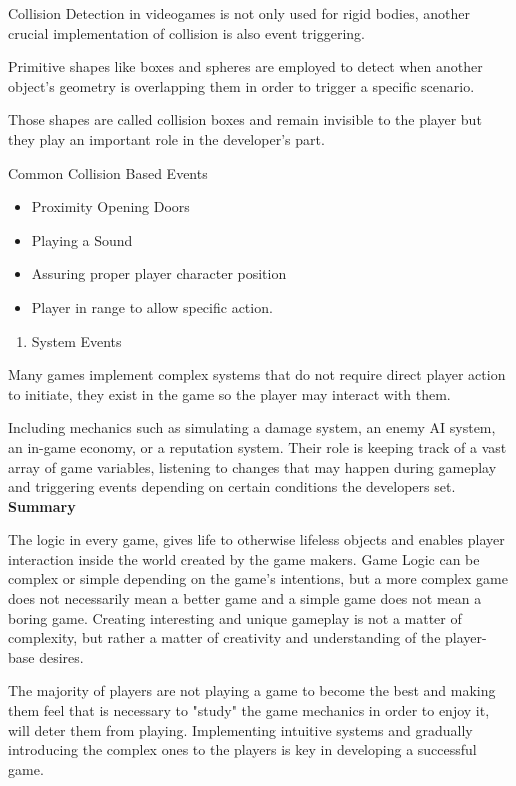 \documentclass[a4paper,one side,12pt]{book}
\begin{document}
Collision Detection in videogames is not only used for rigid bodies,
another crucial implementation of collision is also event triggering.

Primitive shapes like boxes and spheres are employed to detect when
another object's geometry is overlapping them in order
to trigger a specific scenario.

Those shapes are called collision boxes and remain invisible to the
player but they play an important role in the
developer's part.

Common Collision Based Events

\begin{itemize}
\item
  Proximity Opening Doors
\item
  Playing a Sound
\item
  Assuring proper player character position
\item
  Player in range to allow specific action.
\end{itemize}

\begin{enumerate}
\def\labelenumi{\arabic{enumi}.}
\setcounter{enumi}{2}
\item
  {System Events}
\end{enumerate}

Many games implement complex systems that do not require direct player
action to initiate, they exist in the game so the player may interact
with them.

Including mechanics such as simulating a damage system, an enemy AI
system, an in-game economy, or a reputation system. Their role is
keeping track of a vast array of game variables, listening to changes
that may happen during gameplay and triggering events depending on
certain conditions the developers set.\\

\textbf{Summary}

The logic in every game, gives life to otherwise lifeless objects and
enables player interaction inside the world created by the game makers.
Game Logic can be complex or simple depending on the
game's intentions, but a more complex game does not
necessarily mean a better game and a simple game does not mean a boring
game. Creating interesting and unique gameplay is not a matter of
complexity, but rather a matter of creativity and understanding of the
player-base desires.

The majority of players are not playing a game to become the best and
making them feel that is necessary to "study" the game mechanics in
order to enjoy it, will deter them from playing. Implementing intuitive
systems and gradually introducing the complex ones to the players is key
in developing a successful game.
\end{document}

